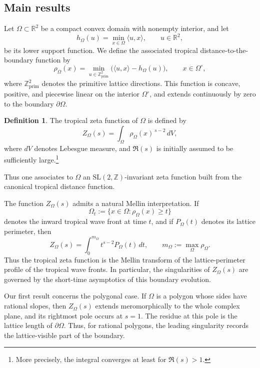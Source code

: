 \documentclass[a4paper,american,11pt]{amsart}
\theoremstyle{plain}
\theoremstyle{definition}
\newtheorem{definition}[theorem]{Definition}
\newcommand{\Z}{\mathbb Z}
\newcommand{\R}{\mathbb R}
\begin{document}
\subsection{Main results}\label{ss:mainresults}

Let \(\Omega\subset \R^2\) be a compact convex domain with nonempty interior,
and let
\[
h_\Omega(u)=\min_{x\in\Omega}\langle u,x\rangle,\qquad u\in\R^2,
\]
be its lower support function. We define the associated tropical
distance-to-the-boundary function by
\[
\rho_\Omega(x)
=
\min_{u\in\Z^2_{\mathrm{prim}}}
\bigl(\langle u,x\rangle-h_\Omega(u)\bigr),
\qquad x\in\Omega^\circ,
\]
where \(\Z^2_{\mathrm{prim}}\) denotes the primitive lattice directions. This
function is concave, positive, and piecewise linear on the interior
\(\Omega^\circ\), and extends continuously by zero to the boundary
\(\partial\Omega\).

\begin{definition}\label{def_zeta}
The tropical zeta function of \(\Omega\) is defined by
\[
Z_\Omega(s)=\int_\Omega \rho_\Omega(x)^{\,s-2}\,dV,
\]
where \(dV\) denotes Lebesgue measure, and \(\Re(s)\) is initially assumed to
be sufficiently large.\footnote{More precisely, the integral converges at least
for \(\Re(s)>1\).}
\end{definition}

Thus one associates to \(\Omega\) an \(\mathrm{SL}(2,\Z)\)-invariant zeta
function built from the canonical tropical distance function.

The function \(Z_\Omega(s)\) admits a natural Mellin interpretation. If
\[
\Omega_t:=\{x\in\Omega:\rho_\Omega(x)\ge t\}
\]
denotes the inward tropical wave front at time \(t\), and if \(P_\Omega(t)\)
denotes its lattice perimeter, then
\[
Z_\Omega(s)=\int_0^{m_\Omega} t^{s-2}P_\Omega(t)\,dt,
\qquad
m_\Omega:=\max_\Omega \rho_\Omega.
\]
Thus the tropical zeta function is the Mellin transform of the
lattice-perimeter profile of the tropical wave fronts. In particular, the
singularities of \(Z_\Omega(s)\) are governed by the short-time asymptotics
of this boundary evolution.

Our first result concerns the polygonal case. If \(\Omega\) is a polygon whose
sides have rational slopes, then \(Z_\Omega(s)\) extends meromorphically to
the whole complex plane, and its rightmost pole occurs at \(s=1\). The
residue at this pole is the lattice length of \(\partial\Omega\). Thus, for
rational polygons, the leading singularity records the lattice-visible part of
the boundary.
\end{document}
